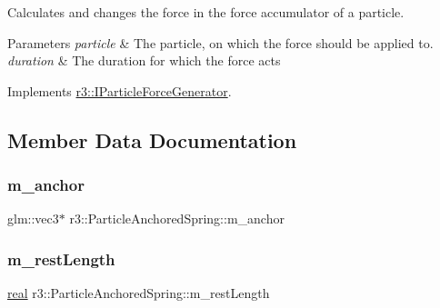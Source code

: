 Calculates and changes the force in the force accumulator of a particle. 


\begin{DoxyParams}{Parameters}
{\em particle} & The particle, on which the force should be applied to. \\
\hline
{\em duration} & The duration for which the force acts \\
\hline
\end{DoxyParams}


Implements \mbox{\hyperlink{classr3_1_1_i_particle_force_generator_a8b692fc3a40f815dc44c106b451c3a90}{r3\+::\+I\+Particle\+Force\+Generator}}.



\subsection{Member Data Documentation}
\mbox{\label{classr3_1_1_particle_anchored_spring_a7ada060d890b9287f3cbc78f125753e7}} 
\subsubsection{\texorpdfstring{m\+\_\+anchor}{m\_anchor}}
{\footnotesize\ttfamily glm\+::vec3$\ast$ r3\+::\+Particle\+Anchored\+Spring\+::m\+\_\+anchor\hspace{0.3cm}{\ttfamily [protected]}}

\mbox{\label{classr3_1_1_particle_anchored_spring_a9440aa0062da7c4030810c3ae0006393}} 
\subsubsection{\texorpdfstring{m\+\_\+rest\+Length}{m\_restLength}}
{\footnotesize\ttfamily \mbox{\hyperlink{namespacer3_ab2016b3e3f743fb735afce242f0dc1eb}{real}} r3\+::\+Particle\+Anchored\+Spring\+::m\+\_\+rest\+Length\hspace{0.3cm}{\ttfamily [protected]}}

